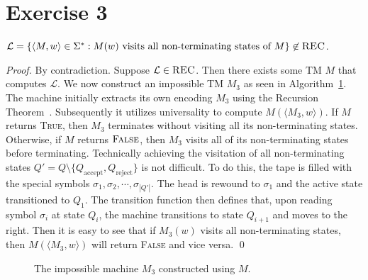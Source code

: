 \documentclass[11pt]{llncs}
\begin{document}
\section*{Exercise 3}
\begin{lemma}
$\mathcal{L} = \{
  \langle M, w \rangle \in \Sigma^*:
  M(w) \text{ visits all non-terminating states of } M
\} \not \in \textsc{REC}$.
\end{lemma}
\begin{proof}
By contradiction. Suppose $\mathcal{L} \in \textsc{REC}$. Then there exists some
TM $M$ that computes $\mathcal{L}$. We now construct an impossible TM $M_3$ as
seen in Algorithm~\ref{alg.ex3}. The machine initially extracts its own encoding
$M_3$ using the Recursion Theorem~\cite{sipser}. Subsequently it utilizes
universality to compute $M(\langle M_3, w \rangle)$. If $M$ returns
\textsc{True}, then $M_3$ terminates without visiting all its non-terminating
states. Otherwise, if $M$ returns $\textsc{False}$, then $M_3$ visits all of its
non-terminating states before terminating. Technically achieving the visitation
of all non-terminating states $Q' = Q \setminus \{Q_\text{accept},
Q_\text{reject}\}$ is not difficult. To do this, the tape is filled with the
special symbols $\sigma_1, \sigma_2, \cdots, \sigma_{|Q'|}$. The head is rewound
to $\sigma_1$ and the active state transitioned to $Q_1$. The transition
function then defines that, upon reading symbol $\sigma_i$ at state $Q_i$, the
machine transitions to state $Q_{i+1}$ and moves to the right. Then it is easy
to see that if $M_3(w)$ visits all non-terminating states, then $M(\langle M_3,
w \rangle)$ will return \textsc{False} and vice versa.
\qed
\end{proof}

\begin{figure}[t]
\begin{algorithm}[H]
  \caption{\label{alg.ex3}
      The impossible machine $M_3$ constructed using $M$.
  }
  \begin{algorithmic}[1]
          \State{}
        \EndIf
        \State{}
      \EndFunction
  \end{algorithmic}
\end{algorithm}
\end{figure}
\end{document}
